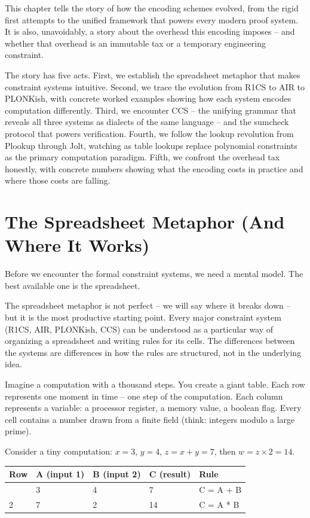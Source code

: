 \documentclass[
  11pt,
  openany]{report}
\begin{document}
This chapter tells the story of how the encoding schemes evolved, from the rigid
first attempts to the unified framework that powers every modern proof system.
It is also, unavoidably, a story about the overhead this encoding imposes -- and
whether that overhead is an immutable tax or a temporary engineering constraint.

The story has five acts. First, we establish the spreadsheet metaphor that makes
constraint systems intuitive. Second, we trace the evolution from R1CS to AIR to
PLONKish, with concrete worked examples showing how each system encodes
computation differently. Third, we encounter CCS -- the unifying grammar that
reveals all three systems as dialects of the same language -- and the sumcheck
protocol that powers verification. Fourth, we follow the lookup revolution from
Plookup through Jolt, watching as table lookups replace polynomial constraints
as the primary computation paradigm. Fifth, we confront the overhead tax
honestly, with concrete numbers showing what the encoding costs in practice and
where those costs are falling.

\section{The Spreadsheet Metaphor (And Where It
Works)}\label{the-spreadsheet-metaphor-and-where-it-works}

Before we encounter the formal constraint systems, we need a mental model. The
best available one is the spreadsheet.

The spreadsheet metaphor is not perfect -- we will say where it breaks down --
but it is the most productive starting point. Every major constraint system
(R1CS, AIR, PLONKish, CCS) can be understood as a particular way of organizing a
spreadsheet and writing rules for its cells. The differences between the systems
are differences in how the rules are structured, not in the underlying idea.

Imagine a computation with a thousand steps. You create a giant table. Each row
represents one moment in time -- one step of the computation. Each column
represents a variable: a processor register, a memory value, a boolean flag.
Every cell contains a number drawn from a finite field (think: integers modulo a
large prime).

Consider a tiny computation: \(x = 3\), \(y = 4\), \(z = x + y = 7\), then
\(w = z \times 2 = 14\).

\begin{longtable}[]{@{}lllll@{}}
\toprule\noalign{}
Row & A (input 1) & B (input 2) & C (result) & Rule \\
\midrule\noalign{}
\arrayrulecolor{MidnightBlue}\midrule\arrayrulecolor{MidnightBorder}
\endhead
\bottomrule\noalign{}
\endlastfoot
1 & 3 & 4 & 7 & C = A + B \\
2 & 7 & 2 & 14 & C = A * B \\
\end{longtable}
\end{document}
